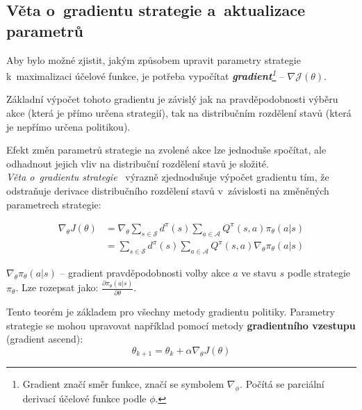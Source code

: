 \pagebreak

\subsection{Věta o~gradientu strategie a~aktualizace parametrů}
Aby bylo možné zjistit, jakým způsobem upravit parametry strategie k~maximalizaci účelové funkce, je potřeba vypočítat \emph{\textbf{gradient}\footnote[2]{Gradient značí směr funkce, značí se symbolem $\nabla_{\phi}$. Počítá se parciální derivací účelové funkce podle $\phi$.}} -- $\nabla \mathcal{J}(\theta)$.

Základní výpočet tohoto gradientu je závislý jak na pravděpodobnosti výběru akce (která je přímo určena strategií), tak na distribučním rozdělení stavů (která je nepřímo určena politikou).

Efekt změn parametrů strategie na zvolené akce lze jednoduše spočítat, ale odhadnout jejich vliv na distribuční rozdělení stavů je složité.\\
\emph{Věta o~gradientu strategie}~\cite{NIPS1999_464d828b} výrazně zjednodušuje výpočet gradientu tím, že odstraňuje derivace distribučního rozdělení stavů v~závislosti na změněných parametrech strategie:

\begin{equation}
    \label{eq:veta_o_gradientu_strategie}
    \begin{split}
        \nabla_\theta J(\theta) 
        &= \nabla_\theta \sum_{s \in \mathcal{S}} d^\pi(s) \sum_{a \in \mathcal{A}} Q^\pi(s, a) \pi_\theta(a \vert s) \\
        &= \sum_{s \in \mathcal{S}} d^\pi(s) \sum_{a \in \mathcal{A}} Q^\pi(s, a) \nabla_\theta \pi_\theta(a \vert s) 
    \end{split}
\end{equation}

\begin{myitemize}
  \item $\nabla_\theta \pi_\theta(a \vert s)$ -- gradient pravděpodobnosti volby akce $a$ ve stavu $s$ podle strategie $\pi_\theta$.
  Lze rozepsat jako: $\frac{\partial \pi_\theta(a \vert s)}{\partial \theta}$.
\end{myitemize}

Tento teorém je základem pro všechny metody gradientu politiky.
Parametry strategie se mohou upravovat například pomocí metody \textbf{gradientního  vzestupu} (gradient ascend):
\begin{equation}
  \theta_{k+1} = \theta_k + \alpha \nabla_\theta J(\theta)
\end{equation}


